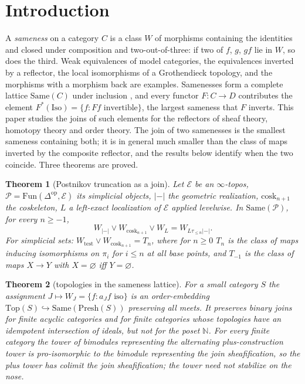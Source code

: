 \documentclass[11pt]{amsart}
\newtheorem{thm}{Theorem}[section]
\theoremstyle{definition}
\newcommand{\Same}{\mathrm{Same}}
\newcommand{\Top}{\mathrm{Top}}
\newcommand{\Iso}{\mathrm{Iso}}
\newcommand{\Presh}{\mathrm{Presh}}
\newcommand{\cosk}{\mathrm{cosk}}
\newcommand{\Fun}{\mathrm{Fun}}
\newcommand{\E}{\mathcal E}
\newcommand{\tr}[1]{\tau_{\le #1}}
\newcommand{\re}{|{-}|}
\newcommand{\Wtest}{W_{\mathrm{test}}}
\begin{document}
\maketitle

\section{Introduction}

A \emph{sameness} on a category $C$ is a class $W$ of morphisms containing the
identities and closed under composition and two-out-of-three: if two of $f$,
$g$, $gf$ lie in $W$, so does the third. Weak equivalences of model categories,
the equivalences inverted by a reflector, the local isomorphisms of a
Grothendieck topology, and the morphisms with a morphism back are examples.
Samenesses form a complete lattice $\Same(C)$ under inclusion \cite{Same}, and
every functor $F\colon C\to D$ contributes the element
$F^*(\Iso)=\{f:Ff\text{ invertible}\}$, the largest sameness that $F$ inverts.
This paper studies the joins of such elements for the reflectors of sheaf
theory, homotopy theory and order theory. The join of two samenesses is the
smallest sameness containing both; it is in general much smaller than the class
of maps inverted by the composite reflector, and the results below identify
when the two coincide. Three theorems are proved.

\begin{thm}[Postnikov truncation as a join]\label{thm:I}
Let $\E$ be an $\infty$-topos, $\mathcal P=\Fun(\Delta^{\mathrm{op}},\E)$ its
simplicial objects, $\re$ the geometric realization, $\cosk_{n+1}$ the
coskeleton, $L$ a left-exact localization of $\E$ applied levelwise. In
$\Same(\mathcal P)$, for every $n\ge-1$,
\[
W_{\re}\vee W_{\cosk_{n+1}}\vee W_{L}=W_{L\tr n\re}.
\]
For simplicial sets: $\Wtest\vee W_{\cosk_{n+1}}=T_n$, where for $n\ge0$ $T_n$ is
the class of maps inducing isomorphisms on $\pi_i$ for $i\le n$ at all base
points, and $T_{-1}$ is the class of maps $X\to Y$ with $X=\varnothing$ iff
$Y=\varnothing$.
\end{thm}

\begin{thm}[topologies in the sameness lattice]\label{thm:II}
For a small category $S$ the assignment $J\mapsto W_J=\{f:a_Jf\text{ iso}\}$
is an order-embedding $\Top(S)\hookrightarrow\Same(\Presh(S))$ preserving all
meets. It preserves binary joins for finite acyclic categories and for finite
categories whose topologies have an idempotent intersection of ideals, but not
for the poset $\mathbb N$. For every finite category the tower of bimodules
representing the alternating plus-construction tower is pro-isomorphic to the
bimodule representing the join sheafification, so the plus tower has colimit
the join sheafification; the tower need not stabilize on the nose.
\end{thm}
\end{document}
